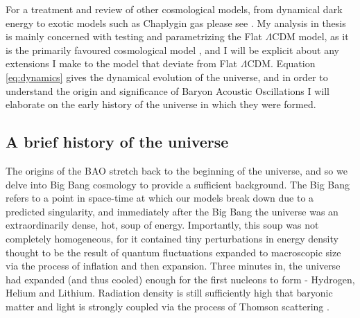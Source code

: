 \documentclass[titlesmallcaps, examinerscopy, copyrightpage]{uqthesis}
\begin{document}
For a treatment and review of other cosmological models, from dynamical dark energy \citep{PeeblesRatra1988} to exotic models such as Chaplygin gas \citep{BentoBertolami2003, Benaoum2012} please see \citet{PeeblesRatra2003,DavisMortsell2007, FriemanTurnerHuterer2008, GottSlepian2011}. My analysis in thesis is mainly concerned with testing and parametrizing the Flat $\Lambda$CDM model, as it is the primarily favoured cosmological model \citep{Planck201416, SanchezKazinBeutler2013}, and I will be explicit about any extensions I make to the model that deviate from Flat $\Lambda$CDM. Equation \eqref{eq:dynamics} gives the dynamical evolution of the universe, and in order to understand the origin and significance of Baryon Acoustic Oscillations I will elaborate on the early history of the universe in which they were formed.\\



\subsection{A brief history of the universe}

The origins of the BAO stretch back to the beginning of the universe, and so we delve into Big Bang cosmology to provide a sufficient background. The Big Bang refers to a point in space-time at which our models break down due to a predicted singularity, and immediately after the Big Bang the universe was an extraordinarily dense, hot, soup of energy. Importantly, this soup was not completely homogeneous, for it contained tiny perturbations in energy density thought to be the result of quantum fluctuations expanded to macroscopic size via the process of inflation and then expansion. Three minutes in, the universe had expanded (and thus cooled) enough for the first nucleons to form - Hydrogen, Helium and Lithium. Radiation density is still sufficiently high that baryonic matter and light is strongly coupled via the process of Thomson scattering \citep{PeeblesYu1970, Doroshkevich1978, SunyaevZeldovich1970}.
\end{document}
